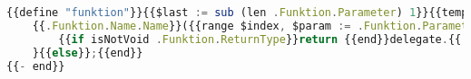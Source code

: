 \documentclass[./einleitung.tex]{subfiles}
\begin{document}
    \begin{lstlisting}[language=Typescript, caption=Template für die Generierung einer Typescript Funktion, label=lst:templateTsFunktion]
{{define "funktion"}}{{$last := sub (len .Funktion.Parameter) 1}}{{template "comment_tab" .Funktion.Kommentar}}
    {{.Funktion.Name.Name}}({{range $index, $param := .Funktion.Parameter}}{{variableName $param}}: ~\\~{{variableType $param  $.ImportKontext}}{{if ne $last $index}}, {{end}}{{end}}){{if isNotVoid .Funktion.ReturnType}}: ~\\~{{variableType .Funktion.ReturnType .ImportKontext}}{{else}}: void{{end}}{{if .ImportKontext.HasDelegate}} {
        {{if isNotVoid .Funktion.ReturnType}}return {{end}}delegate.{{.Funktion.Name.Name}}(this~\\~{{range $index, $param := .Funktion.Parameter}}, {{variableName $param}}{{end}});
    }{{else}};{{end}}
{{- end}}
    \end{lstlisting}

    
\end{document}
